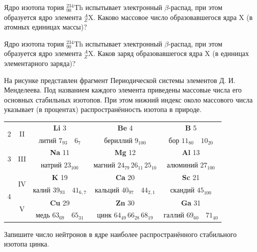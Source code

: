 \begin{taskbasic}[code={\label{task:nuclear_beta_decay_mass_number}}]
Ядро изотопа тория $^{234}_{90}\text{Th}$ испытывает электронный $\beta$-распад, при этом образуется ядро элемента $^A_Z\text{X}$. Каково массовое число образовавшегося ядра $\text{X}$ (в атомных единицах массы)?

\end{taskbasic}

\begin{taskbasic}[code={\label{task:nuclear_beta_decay_charge}}]
Ядро изотопа тория $^{234}_{90}\text{Th}$ испытывает электронный $\beta$-распад, при этом образуется ядро элемента $^A_Z\text{X}$. Каков заряд образовавшегося ядра $\text{X}$ (в единицах элементарного заряда)?

\end{taskbasic}

\begin{taskbasic}[code={\label{task:nuclear_mendeleev_table_zinc}}]
На рисунке представлен фрагмент Периодической системы элементов Д. И. Менделеева. Под названием каждого элемента приведены массовые числа его основных стабильных изотопов. При этом нижний индекс около массового числа указывает (в процентах) распространённость изотопа в природе.

\nopagebreak\smallskip
\begin{center}
\small
\begin{tabular}{|c|c||c|c|c|}
\hline
\multirow{2}{*}{2} & \multirow{2}{*}{II} & \textbf{Li} \hfill 3 & \textbf{Be} \hfill 4 & \textbf{B} \hfill 5 \\
 & & литий $7_{93} \quad 6_7$ & бериллий $9_{100}$ & бор $11_{80} \quad 10_{20}$ \\ \hline
\multirow{2}{*}{3} & \multirow{2}{*}{III} & \textbf{Na} \hfill 11 & \textbf{Mg} \hfill 12 & \textbf{Al} \hfill 13 \\
 & & натрий $23_{100}$ & магний $24_{79} \, 26_{11} \, 25_{10}$ & алюминий $27_{100}$ \\ \hline
\multirow{4}{*}{4} & \multirow{2}{*}{IV} & \textbf{K} \hfill 19 & \textbf{Ca} \hfill 20 & \textbf{Sc} \hfill 21 \\
 & & калий $39_{93} \quad 41_{6,7}$ & кальций $40_{97} \quad 44_{2,1}$ & скандий $45_{100}$ \\ \cline{2-5}
 & \multirow{2}{*}{V} & \textbf{Cu} \hfill 29 & \textbf{Zn} \hfill 30 & \textbf{Ga} \hfill 31 \\
 & & медь $63_{69} \quad 65_{31}$ & цинк $64_{49} \, 66_{28} \, 68_{19}$ & галлий $69_{60} \quad 71_{40}$ \\ \hline
\end{tabular}
\end{center}
\smallskip

Запишите число нейтронов в ядре наиболее распространённого стабильного изотопа цинка.

\end{taskbasic}

